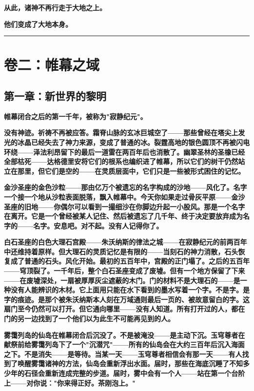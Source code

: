 \documentclass[12pt,a4paper,openany]{ctexbook}
\begin{document}
\textbf{从此，诸神不再行走于大地之上。}


\textbf{他们变成了大地本身。}


\bigskip\hrule\bigskip


\chapter{卷二：帷幕之域}


\section*{第一章：新世界的黎明}


\textbf{帷幕闭合之后的第一千年，被称为"寂静纪元"。}


\textbf{没有神迹。祈祷不再被应答。霜脊山脉的玄冰巨城空了——那些曾经在塔尖上发光的冰晶已经失去了神力来源，变成了普通的冰。裂霆高地的银色圆顶不再被闪电环绕——泽法利昂留下的最后一道雷在两百年后也消散了。幽翠圣林的圣橡已经全部枯死——达格德里安将它们的根系也编织进了帷幕，所以它们的树干仍然站立在那里，但它们是空的——在灵质层面中，它们只是一些被形式困住的记忆。}


\textbf{金沙圣座的金色沙粒——那由亿万个被遗忘的名字构成的沙地——风化了。名字一个接一个地从沙粒表面脱落，飘入帷幕中。今天你如果走过骨灰平原——金沙圣座的旧地——你偶尔可以看到一撮细沙在你脚边升起一小股风。那是一个名字在离开。它是一个曾经被某人记住、然后被遗忘了几千年、终于决定要放弃成为名字的——名字。安息吧。对不起。没有人记得你了。}


\textbf{白石圣座的白色大理石宫殿——朱沃纳斯的律法之城——在寂静纪元的前两百年中还维持着原样。但大理石的灵质记忆是有限的——当刻石的神力消散，石头恢复成了普通的石头。风化开始。最初的五百年中，宫殿的正门塌了。之后的五百年——穹顶裂了。一千年后，整个白石圣座变成了废墟。但有一个地方保留了下来——在废墟深处，一扇被厚厚灰尘遮蔽的木门。门的材料不是大理石的——是一种没有人能辨识的木材。它上面用只能在水下看到的墨水写着一个字。不是字。是字的痕迹。是那个被朱沃纳斯本人刻在万域通则最后一页的、被故意留白的字。这扇门至今仍然可以打开。但它通向哪里——没有人知道。所有打开过的人，都在门的另一边找到了一个他们以为此生不可能再见到的人。}


\textbf{雾霭列岛的仙岛在帷幕闭合后沉没了。不是被淹没——是主动下沉。玉穹尊者在献祭前给雾霭列岛下了一个"沉潜咒"——所有的仙岛会在大约三百年后沉入海面之下。不是消失——是等待。当某一天——玉穹尊者相信会有那一天——有人找到了唤醒雾霭诸神的方法，仙岛会重新浮出水面。届时，那些在海底沉睡了不知多少年的石径会重新连成完整的步道。届时，雾中会有一个人——站在第一个台阶上——对你说："你来得正好。茶刚泡上。"}
\end{document}
